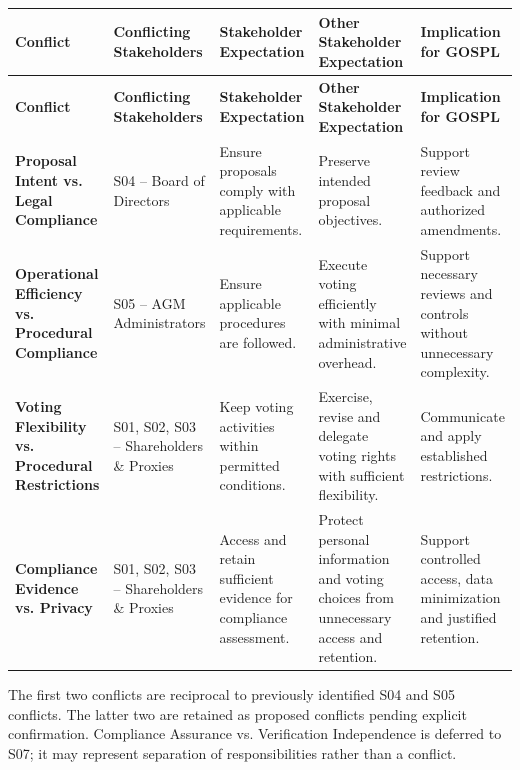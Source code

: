\documentclass[11pt,a4paper]{article}
\begin{document}
\begingroup\small
\begin{longtable}{@{}>{\raggedright\arraybackslash}p{}>{\raggedright\arraybackslash}p{}>{\raggedright\arraybackslash}p{}>{\raggedright\arraybackslash}p{}>{\raggedright\arraybackslash}p{}@{}}
\toprule
\textbf{Conflict} & \textbf{Conflicting Stakeholders} & \textbf{Stakeholder Expectation} & \textbf{Other Stakeholder Expectation} & \textbf{Implication for GOSPL} \\
\midrule
\endfirsthead
\toprule
\textbf{Conflict} & \textbf{Conflicting Stakeholders} & \textbf{Stakeholder Expectation} & \textbf{Other Stakeholder Expectation} & \textbf{Implication for GOSPL} \\
\midrule
\endhead
\bottomrule
\endfoot
\textbf{Proposal Intent vs. Legal Compliance} & S04 -- Board of Directors & Ensure proposals comply with applicable requirements. & Preserve intended proposal objectives. & Support review feedback and authorized amendments. \\
\addlinespace
\textbf{Operational Efficiency vs. Procedural Compliance} & S05 -- AGM Administrators & Ensure applicable procedures are followed. & Execute voting efficiently with minimal administrative overhead. & Support necessary reviews and controls without unnecessary complexity. \\
\addlinespace
\textbf{Voting Flexibility vs. Procedural Restrictions} & S01, S02, S03 -- Shareholders \& Proxies & Keep voting activities within permitted conditions. & Exercise, revise and delegate voting rights with sufficient flexibility. & Communicate and apply established restrictions. \\
\addlinespace
\textbf{Compliance Evidence vs. Privacy} & S01, S02, S03 -- Shareholders \& Proxies & Access and retain sufficient evidence for compliance assessment. & Protect personal information and voting choices from unnecessary access and retention. & Support controlled access, data minimization and justified retention. \\
\end{longtable}
\endgroup

The first two conflicts are reciprocal to previously identified S04 and S05 conflicts. The latter two are retained as proposed conflicts pending explicit confirmation. Compliance Assurance vs. Verification Independence is deferred to S07; it may represent separation of responsibilities rather than a conflict.
\end{document}

